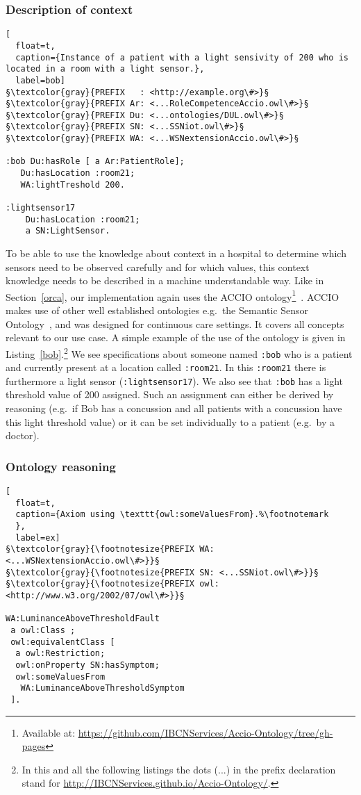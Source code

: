 \subsubsection{Description of context}
\begin{lstlisting}[
  float=t,
  caption={Instance of a patient with a light sensivity of 200 who is located in a room with a light sensor.},
  label=bob]
§\textcolor{gray}{PREFIX   : <http://example.org\#>}§
§\textcolor{gray}{PREFIX Ar: <...RoleCompetenceAccio.owl\#>}§
§\textcolor{gray}{PREFIX Du: <...ontologies/DUL.owl\#>}§
§\textcolor{gray}{PREFIX SN: <...SSNiot.owl\#>}§
§\textcolor{gray}{PREFIX WA: <...WSNextensionAccio.owl\#>}§

:bob Du:hasRole [ a Ar:PatientRole];
   Du:hasLocation :room21;
   WA:lightTreshold 200.

:lightsensor17 
    Du:hasLocation :room21;
    a SN:LightSensor.
\end{lstlisting}
To be able to use the knowledge about context in a hospital to determine which sensors need to be observed carefully and for which values, this context knowledge needs 
to be described in a machine understandable way. Like in Section~\ref{orca}, our implementation again uses   
the ACCIO ontology\footnote{Available at: \url{https://github.com/IBCNServices/Accio-Ontology/tree/gh-pages}}~\cite{accioont}. 
ACCIO makes use of other well established ontologies e.g.\ the Semantic Sensor Ontology~\cite{ssn},
and was designed for %
continuous care settings. It covers all concepts relevant to our use case.
A simple example of the use of the ontology is given in Listing~\ref{bob}.\footnote{In this and all the following listings the dots (...)
  in the prefix declaration stand for \url{http://IBCNServices.github.io/Accio-Ontology/}.}
We see specifications about someone named \texttt{:bob} who is a patient and currently present at 
a location called \texttt{:room21}. 
In this \texttt{:room21} there is furthermore a light sensor (\texttt{:lightsensor17}).
We also see that \texttt{:bob} has
a light threshold value
of 200 assigned. Such an assignment can either be derived by reasoning (e.g.\ if 
Bob has a concussion and all patients with a concussion have this light threshold value) or it can be set individually to a patient (e.g.\ by a doctor).

\subsubsection{Ontology reasoning}\label{ontres}
\begin{lstlisting}[
  float=t,
  caption={Axiom using \texttt{owl:someValuesFrom}.%\footnotemark
  },
  label=ex]  
§\textcolor{gray}{\footnotesize{PREFIX WA: <...WSNextensionAccio.owl\#>}}§
§\textcolor{gray}{\footnotesize{PREFIX SN: <...SSNiot.owl\#>}}§
§\textcolor{gray}{\footnotesize{PREFIX owl:<http://www.w3.org/2002/07/owl\#>}}§

WA:LuminanceAboveThresholdFault 
 a owl:Class ;
 owl:equivalentClass [ 
  a owl:Restriction;
  owl:onProperty SN:hasSymptom;
  owl:someValuesFrom 
   WA:LuminanceAboveThresholdSymptom 
 ].
\end{lstlisting}

